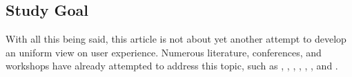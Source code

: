 \documentclass{acm_proc_article-sp}
\begin{document}
\subsection{Study Goal}
With all this being said, this article is not about yet another
attempt to develop an uniform view on user experience. Numerous
literature, conferences, and workshops have already attempted to
address this topic, such as \citet{early:forlizzi},
\citet{emotional:norman}, \citet{experience:forlizzi},
\citet{action:dourish}, \citet{ux:hassenzahl},
\citet{experience:desmet}, and \citet{ux:law}.

\end{document}
